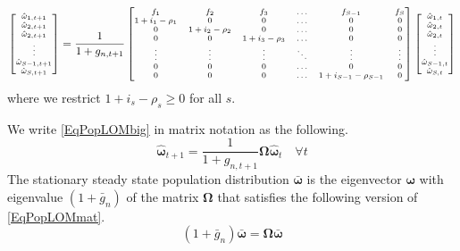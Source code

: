 \documentclass[letterpaper,12pt]{article}
\theoremstyle{definition}
\begin{document}
  \begin{equation}\label{EqPopLOMbig}
    \scriptsize{\begin{bmatrix}
      \hat{\omega}_{1,t+1} \\ \hat{\omega}_{2,t+1} \\ \hat{\omega}_{2,t+1} \\ \vdots \\ \hat{\omega}_{S-1,t+1} \\ \hat{\omega}_{S,t+1}
    \end{bmatrix} = \frac{1}{1 + g_{n,t+1}}
    \begin{bmatrix}
      f_1 & f_2 & f_3 & \hdots & f_{S-1} & f_S \\
      1+i_1-\rho_1 & 0 & 0 & \hdots & 0 & 0 \\
      0 & 1+i_2-\rho_2 & 0 & \hdots & 0 & 0 \\
      0 & 0 & 1+i_3-\rho_3 & \hdots & 0 & 0 \\
      \vdots & \vdots & \vdots & \ddots & \vdots & \vdots \\
      0 & 0 & 0 & \hdots & 0 & 0 \\
      0 & 0 & 0 & \hdots & 1+i_{S-1}-\rho_{S-1} & 0
    \end{bmatrix}
    \begin{bmatrix}
      \hat{\omega}_{1,t} \\ \hat{\omega}_{2,t} \\ \hat{\omega}_{2,t} \\ \vdots \\ \hat{\omega}_{S-1,t} \\ \hat{\omega}_{S,t}
    \end{bmatrix}}
  \end{equation}
  where we restrict $1+i_s-\rho_s\geq 0$ for all $s$.

  We write \eqref{EqPopLOMbig} in matrix notation as the following.
  \begin{equation}\label{EqPopLOMmat}
    \bm{\hat{\omega}}_{t+1} = \frac{1}{1+g_{n,t+1}}\bm{\Omega}\bm{\hat{\omega}}_t \quad\forall t
  \end{equation}
  The stationary steady state population distribution $\bm{\bar{\omega}}$ is the eigenvector $\bm{\omega}$ with eigenvalue $(1+\bar{g}_n)$ of the matrix $\bm{\Omega}$ that satisfies the following version of \eqref{EqPopLOMmat}.
  \begin{equation}\label{EqPopLOMss}
    (1+\bar{g}_n)\bm{\bar{\omega}} = \bm{\Omega}\bm{\bar{\omega}}
  \end{equation}
\end{document}
